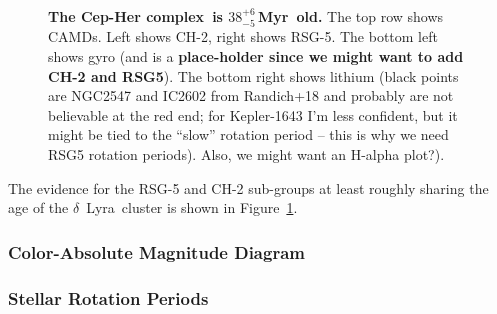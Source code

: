\documentclass[12pt,twocolumn,linenumbers]{aastex63}
\newcommand{\cn}{Cep-Her complex} %
\newcommand{\clusterage}{$38^{+6}_{-5}$\,Myr} %
\begin{document}
\begin{figure}[tp]
\begin{center}
		\vspace{-0.6cm}
	\end{center}
	\vspace{-0.7cm}
	\caption{
		{\bf The \cn\ is \clusterage\ old.} 
    The top row shows CAMDs.  Left shows CH-2, right shows RSG-5.  The
    bottom left shows gyro (and is a {\bf place-holder since we might
    want to add CH-2 and RSG5}).  The bottom right shows lithium
    (black points are NGC2547 and IC2602 from Randich+18 and probably
    are not believable at the red end; for Kepler-1643 I'm less
    confident, but it might be tied to the ``slow'' rotation period --
    this is why we need RSG5 rotation periods).  Also, we might want
    an H-alpha plot?).
		\label{fig:age}
	}
\end{figure}



The evidence for the RSG-5 and CH-2 sub-groups at least roughly
sharing the age of the $\delta$\ Lyra\ cluster is shown in
Figure~\ref{fig:age}.

\subsubsection{Color-Absolute Magnitude Diagram}
\label{sec:camd}

\subsubsection{Stellar Rotation Periods}
\end{document}

